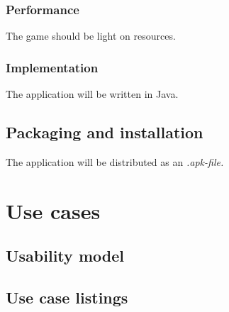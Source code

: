 \documentclass{article}
\begin{document}
\subsubsection{Performance}
The game should be light on resources.
\subsubsection{Implementation}
The application will be written in Java.
\subsection{Packaging and installation}
The application will be distributed as an \it{.apk}-file. 
\section{Use cases}
\subsection{Usability model}
\subsection{Use case listings}
\end{document}
